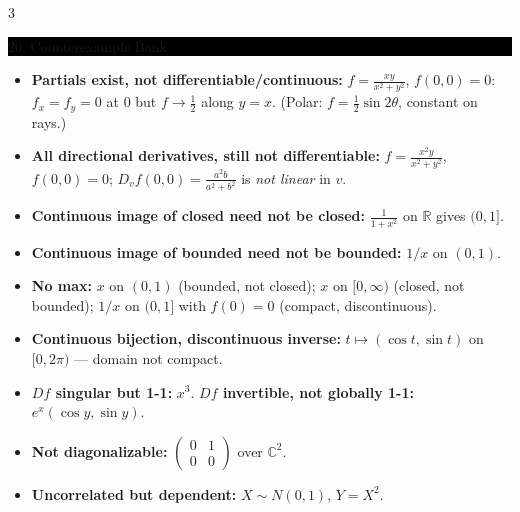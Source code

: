 \documentclass[8pt,letterpaper]{article}
\makeatletter
\newcommand{\sect}[1]{%
  \vspace{2.2pt}%
  \noindent\colorbox{black}{\parbox{\dimexpr\linewidth-2\fboxsep}{%
    \color{white}\bfseries\scshape\fontsize{6.4}{7.4}\selectfont
    \hyphenpenalty=10000\exhyphenpenalty=10000\raggedright #1}}%
  \vspace{1.4pt}\par\nopagebreak\@afterheading}
\newenvironment{tl}
  {\begin{itemize}[leftmargin=6pt,itemsep=0.3pt,topsep=1pt,parsep=0pt,
                   partopsep=0pt,label=\textcolor{gray}{\tiny$\bullet$}]}
  {\end{itemize}}
\newcommand{\R}{\mathbb{R}}
\newcommand{\Dd}{D}
\makeatother
\begin{document}
\begin{multicols}{3}
\sect{20. Counterexample Bank}
\begin{tl}
\item \textbf{Partials exist, not differentiable/continuous:} $f=\frac{xy}{x^2+y^2}$, $f(0,0)=0$: $f_x=f_y=0$ at $0$ but $f\to\frac12$ along $y=x$. (Polar: $f=\frac12\sin2\theta$, constant on rays.)
\item \textbf{All directional derivatives, still not differentiable:} $f=\frac{x^2y}{x^2+y^2}$, $f(0,0)=0$; $D_vf(0,0)=\frac{a^2b}{a^2+b^2}$ is \emph{not linear} in $v$.
\item \textbf{Continuous image of closed need not be closed:} $\frac{1}{1+x^2}$ on $\R$ gives $(0,1]$.
\item \textbf{Continuous image of bounded need not be bounded:} $1/x$ on $(0,1)$.
\item \textbf{No max:} $x$ on $(0,1)$ (bounded, not closed); $x$ on $[0,\infty)$ (closed, not bounded); $1/x$ on $(0,1]$ with $f(0)=0$ (compact, discontinuous).
\item \textbf{Continuous bijection, discontinuous inverse:} $t\mapsto(\cos t,\sin t)$ on $[0,2\pi)$ --- domain not compact.
\item \textbf{$\Dd f$ singular but 1-1:} $x^3$. \textbf{$\Dd f$ invertible, not globally 1-1:} $e^x(\cos y,\sin y)$.
\item \textbf{Not diagonalizable:} $\left(\begin{smallmatrix}0&1\\0&0\end{smallmatrix}\right)$ over $\mathbb C^2$.
\item \textbf{Uncorrelated but dependent:} $X\sim N(0,1)$, $Y=X^2$.
\end{tl}


\end{multicols}
\end{document}
